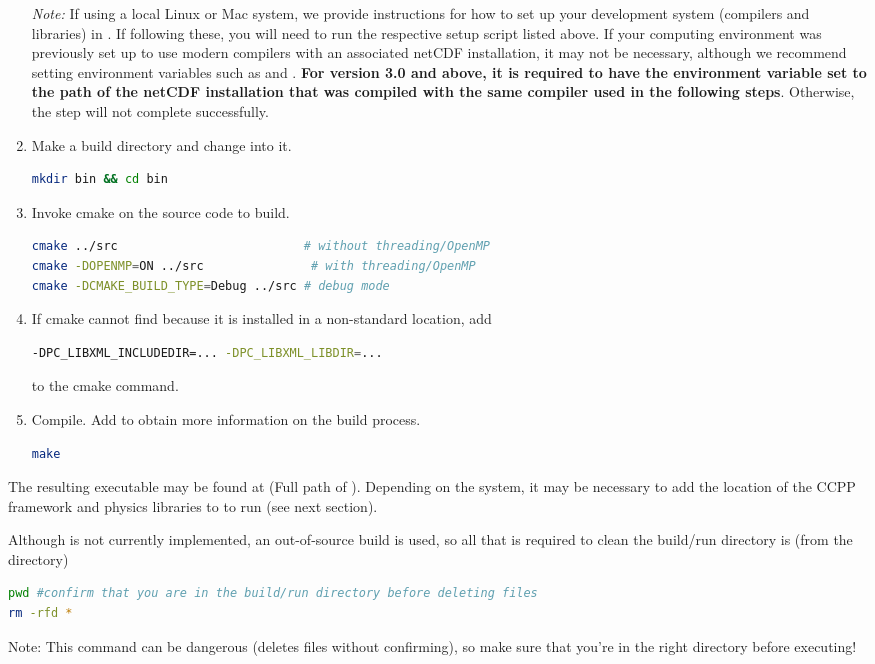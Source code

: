 \begin{enumerate}
\emph{Note:} If using a local Linux or Mac system, we provide instructions for how to set up your development system (compilers and libraries) in . If following these, you will need to run the respective setup script listed above. If your computing environment was previously set up to use modern compilers with an associated netCDF installation, it may not be necessary, although we recommend setting environment variables such as  and . \textbf{For version 3.0 and above, it is required to have the  environment variable set to the path of the netCDF installation that was compiled with the same compiler used in the following steps}. Otherwise, the  step will not complete successfully.

    \item Make a build directory and change into it.
\begin{lstlisting}[language=bash]
mkdir bin && cd bin
\end{lstlisting}
    \item Invoke cmake on the source code to build.
\begin{lstlisting}[language=bash]
cmake ../src                          # without threading/OpenMP
cmake -DOPENMP=ON ../src               # with threading/OpenMP
cmake -DCMAKE_BUILD_TYPE=Debug ../src # debug mode
\end{lstlisting}
    \item If cmake cannot find  because it is installed in a non-standard location, add
\begin{lstlisting}[language=bash]
-DPC_LIBXML_INCLUDEDIR=... -DPC_LIBXML_LIBDIR=...
\end{lstlisting}
    to the cmake command.
    \item Compile. Add  to obtain more information on the build process.
\begin{lstlisting}[language=bash]
make
\end{lstlisting}
\end{enumerate}

The resulting executable may be found at  (Full path of ). Depending on the system, it may be necessary to add the location of the CCPP framework and physics libraries to  to run  (see next section).

Although  is not currently implemented, an out-of-source build is used, so all that is required to clean the build/run directory is (from the  directory)
\begin{lstlisting}[language=bash]
pwd #confirm that you are in the build/run directory before deleting files
rm -rfd *
\end{lstlisting}
Note: This command can be dangerous (deletes files without confirming), so make sure that you're in the right directory before executing!

